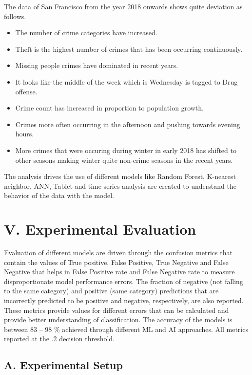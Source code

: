 \documentclass[11 pt,conference,final,]{IEEEtran}
\providecommand{\tightlist}{%
  \setlength{\itemsep}{0pt}\setlength{\parskip}{0pt}}
\begin{document}
The data of San Francisco from the year 2018 onwards shows quite
deviation as follows.

\begin{itemize}
\tightlist
\item
  The number of crime categories have increased.
\item
  Theft is the highest number of crimes that has been occurring
  continuously.
\item
  Missing people crimes have dominated in recent years.
\item
  It looks like the middle of the week which is Wednesday is tagged to
  Drug offense.
\item
  Crime count has increased in proportion to population growth.
\item
  Crimes more often occurring in the afternoon and pushing towards
  evening hours.
\item
  More crimes that were occuring during winter in early 2018 has shifted
  to other seasons making winter quite non-crime seasons in the recent
  years.
\end{itemize}

The analysis drives the use of different models like Random Forest,
K-nearest neighbor, ANN, Tablet and time series analysis are created to
understand the behavior of the data with the model.

\section{V. Experimental Evaluation}\label{iv.-experimental-evaluation}

Evaluation of different models are driven through the confusion metrics
that contain the values of True positive, False Positive, True Negative
and False Negative that helps in False Positive rate and False Negative
rate to measure disproportionate model performance errors. The fraction
of negative (not falling to the same category) and positive (same
category) predictions that are incorrectly predicted to be positive and
negative, respectively, are also reported. These metrics provide values
for different errors that can be calculated and provide better
understanding of classification. The accuracy of the models is between
83 -- 98 \% achieved through different ML and AI approaches. All metrics
reported at the .2 decision threshold.

\subsection{A. Experimental Setup}\label{a.-experimental-setup}
\end{document}
